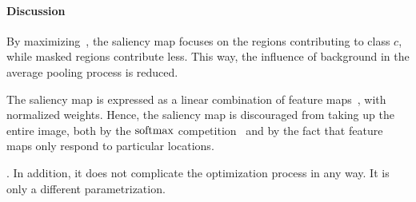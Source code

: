 
\paragraph{Discussion}

By maximizing~, the saliency map focuses on the regions contributing to class $c$, while masked regions contribute less. This way, the influence of background in the average pooling process is reduced.

The saliency map is expressed as a linear combination of feature maps~, with normalized weights. Hence, the saliency map is discouraged from taking up the entire image, both by the $\operatorname{softmax}$ competition~ and by the fact that feature maps only respond to particular locations.

. In addition, it does not complicate the optimization process in any way. It is only a different parametrization.


